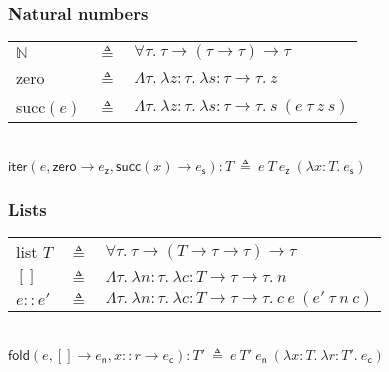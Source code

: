 \documentclass{article}
\begin{document}
\subsubsection*{Natural numbers}

\hspace{-1em}
\begin{tabular}{lcl}
$\mathbb{N}$ & \hspace{-0.5em}$\triangleq$ & \hspace{-0.5em}$\forall\tau.\ \tau\to(\tau\to\tau)\to\tau$\\[0.5em]
\textsf{zero} & \hspace{-0.5em}$\triangleq$ & \hspace{-0.5em}$\Lambda\tau.\ \lambda z:\tau.\ \lambda s:\tau\to\tau.\ z$\\[0.5em]
\textsf{succ}$(e)$ & \hspace{-0.5em}$\triangleq$ & \hspace{-0.5em}$\Lambda\tau.\ \lambda z:\tau.\ \lambda s:\tau\to\tau.\ s\ (e\ \tau\ z\ s)$\\[0.5em]
\end{tabular}\\
$\textsf{iter}(e,\textsf{zero}\to e_\textsf{z},\textsf{succ}(x)\to e_\textsf{s}):T\ \triangleq\ e\ T\ e_\textsf{z}\ (\lambda x:T.\ e_\textsf{s})$

\subsubsection*{Lists}

\hspace{-1em}
\begin{tabular}{lcl}
\textsf{list }$T$ & \hspace{-0.5em}$\triangleq$ & \hspace{-0.5em}$\forall\tau.\ \tau\to(T\to\tau\to\tau)\to\tau$\\[0.5em]
$[]$ & \hspace{-0.5em}$\triangleq$ & \hspace{-0.5em}$\Lambda\tau.\ \lambda n:\tau.\ \lambda c:T\to\tau\to\tau.\ n$\\[0.5em]
$e::e'$ & \hspace{-0.5em}$\triangleq$ & \hspace{-0.5em}$\Lambda\tau.\ \lambda n:\tau.\ \lambda c:T\to\tau\to\tau.\ c\ e\ (e'\ \tau\ n\ c)$\\[0.5em]
\end{tabular}\\
$\textsf{fold}(e,[]\to e_\textsf{n},x::r\to e_\textsf{c}):T'\ \triangleq\ e\ T'\ e_\textsf{n}\ (\lambda x:T.\ \lambda r:T'.\ e_\textsf{c})$
\end{document}
